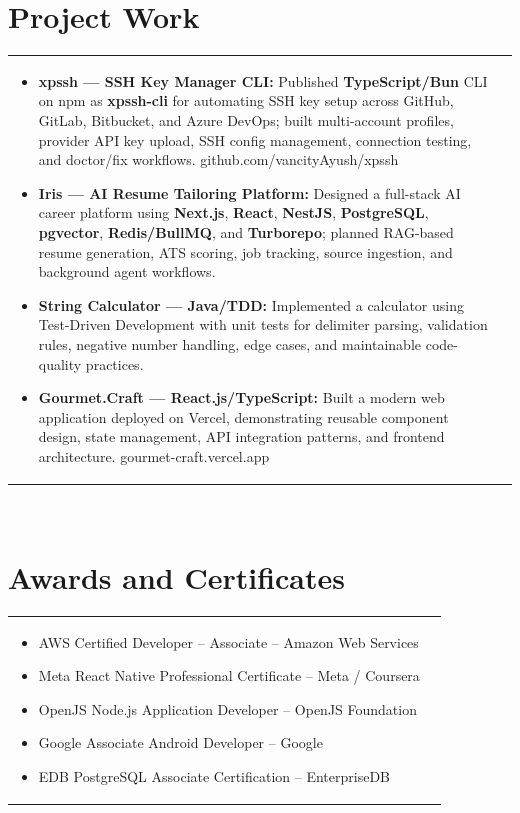 \documentclass[a4paper,8pt]{article}
\begin{document}
\section{Project Work}
\begin{tabularx}{\linewidth}{ @{}l r@{} }
\begin{minipage}[t]{\linewidth}
    \begin{itemize}[nosep,after=\strut, leftmargin=2em, itemsep=2pt]
        \item \textbf{xpssh --- SSH Key Manager CLI:} Published \textbf{TypeScript/Bun} CLI on npm as \textbf{xpssh-cli} for automating SSH key setup across GitHub, GitLab, Bitbucket, and Azure DevOps; built multi-account profiles, provider API key upload, SSH config management, connection testing, and doctor/fix workflows. github.com/vancityAyush/xpssh
        \item \textbf{Iris --- AI Resume Tailoring Platform:} Designed a full-stack AI career platform using \textbf{Next.js}, \textbf{React}, \textbf{NestJS}, \textbf{PostgreSQL}, \textbf{pgvector}, \textbf{Redis/BullMQ}, and \textbf{Turborepo}; planned RAG-based resume generation, ATS scoring, job tracking, source ingestion, and background agent workflows.
        \item \textbf{String Calculator --- Java/TDD:} Implemented a calculator using Test-Driven Development with unit tests for delimiter parsing, validation rules, negative number handling, edge cases, and maintainable code-quality practices.
        \item \textbf{Gourmet.Craft --- React.js/TypeScript:} Built a modern web application deployed on Vercel, demonstrating reusable component design, state management, API integration patterns, and frontend architecture. gourmet-craft.vercel.app
    \end{itemize}
    \end{minipage}
\end{tabularx}\\[3pt]

\section{Awards and Certificates}
\begin{tabularx}{\linewidth}{ @{}l r@{} }
\begin{minipage}[t]{\linewidth}
    \begin{itemize}[nosep,after=\strut, leftmargin=2em, itemsep=2pt]
        \item AWS Certified Developer -- Associate -- Amazon Web Services
        \item Meta React Native Professional Certificate -- Meta / Coursera
        \item OpenJS Node.js Application Developer -- OpenJS Foundation
        \item Google Associate Android Developer -- Google
        \item EDB PostgreSQL Associate Certification -- EnterpriseDB
    \end{itemize}
\end{minipage}
\end{tabularx}
\end{document}
